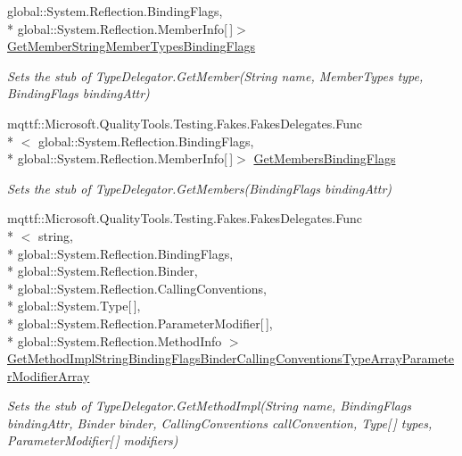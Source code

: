\begin{DoxyCompactItemize}
global\-::\-System.\-Reflection.\-Binding\-Flags, \\*
global\-::\-System.\-Reflection.\-Member\-Info\mbox{[}$\,$\mbox{]}$>$ \hyperlink{class_system_1_1_reflection_1_1_fakes_1_1_stub_type_delegator_a43513492c2a44728a2340b91e5dcf0d0}{Get\-Member\-String\-Member\-Types\-Binding\-Flags}
\begin{DoxyCompactList}\small\item\em Sets the stub of Type\-Delegator.\-Get\-Member(\-String name, Member\-Types type, Binding\-Flags binding\-Attr)\end{DoxyCompactList}\item 
mqttf\-::\-Microsoft.\-Quality\-Tools.\-Testing.\-Fakes.\-Fakes\-Delegates.\-Func\\*
$<$ global\-::\-System.\-Reflection.\-Binding\-Flags, \\*
global\-::\-System.\-Reflection.\-Member\-Info\mbox{[}$\,$\mbox{]}$>$ \hyperlink{class_system_1_1_reflection_1_1_fakes_1_1_stub_type_delegator_a7720980b43e3889914c4eaeeb0dd0f7f}{Get\-Members\-Binding\-Flags}
\begin{DoxyCompactList}\small\item\em Sets the stub of Type\-Delegator.\-Get\-Members(\-Binding\-Flags binding\-Attr)\end{DoxyCompactList}\item 
mqttf\-::\-Microsoft.\-Quality\-Tools.\-Testing.\-Fakes.\-Fakes\-Delegates.\-Func\\*
$<$ string, \\*
global\-::\-System.\-Reflection.\-Binding\-Flags, \\*
global\-::\-System.\-Reflection.\-Binder, \\*
global\-::\-System.\-Reflection.\-Calling\-Conventions, \\*
global\-::\-System.\-Type\mbox{[}$\,$\mbox{]}, \\*
global\-::\-System.\-Reflection.\-Parameter\-Modifier\mbox{[}$\,$\mbox{]}, \\*
global\-::\-System.\-Reflection.\-Method\-Info $>$ \hyperlink{class_system_1_1_reflection_1_1_fakes_1_1_stub_type_delegator_ac06eb077d74ff303fdf2090c0c35ce3a}{Get\-Method\-Impl\-String\-Binding\-Flags\-Binder\-Calling\-Conventions\-Type\-Array\-Parameter\-Modifier\-Array}
\begin{DoxyCompactList}\small\item\em Sets the stub of Type\-Delegator.\-Get\-Method\-Impl(\-String name, Binding\-Flags binding\-Attr, Binder binder, Calling\-Conventions call\-Convention, Type\mbox{[}$\,$\mbox{]} types, Parameter\-Modifier\mbox{[}$\,$\mbox{]} modifiers)\end{DoxyCompactList}\item 

\end{DoxyCompactItemize}
